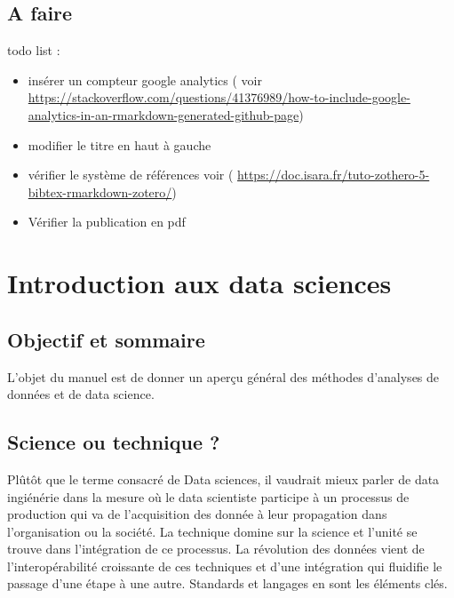 \documentclass[
]{book}
\providecommand{\tightlist}{%
  \setlength{\itemsep}{0pt}\setlength{\parskip}{0pt}}
\begin{document}
\hypertarget{a-faire}{%
\section{A faire}\label{a-faire}}

todo list :

\begin{itemize}
\tightlist
\item
  insérer un compteur google analytics ( voir \url{https://stackoverflow.com/questions/41376989/how-to-include-google-analytics-in-an-rmarkdown-generated-github-page})
\item
  modifier le titre en haut à gauche
\item
  vérifier le système de références voir ( \url{https://doc.isara.fr/tuto-zothero-5-bibtex-rmarkdown-zotero/})
\item
  Vérifier la publication en pdf
\end{itemize}

\hypertarget{intro}{%
\chapter{Introduction aux data sciences}\label{intro}}

\hypertarget{objectif-et-sommaire}{%
\section{Objectif et sommaire}\label{objectif-et-sommaire}}

L'objet du manuel est de donner un aperçu général des méthodes d'analyses de données et de data science.

\hypertarget{science-ou-technique}{%
\section{Science ou technique ?}\label{science-ou-technique}}

Plûtôt que le terme consacré de Data sciences, il vaudrait mieux parler de data ingiénérie dans la mesure où le data scientiste participe à un processus de production qui va de l'acquisition des donnée à leur propagation dans l'organisation ou la société. La technique domine sur la science et l'unité se trouve dans l'intégration de ce processus. La révolution des données vient de l'interopérabilité croissante de ces techniques et d'une intégration qui fluidifie le passage d'une étape à une autre. Standards et langages en sont les éléments clés.
\end{document}
